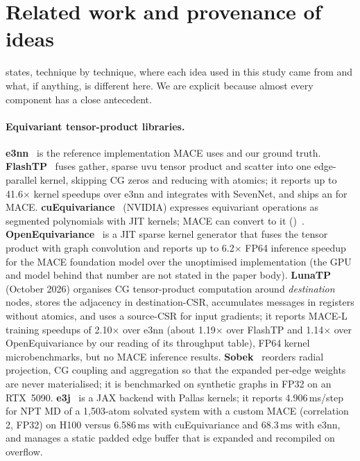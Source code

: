 \section{Related work and provenance of ideas}
\label{sec:related}

 states, technique by technique, where each idea used in this study came from and what, if anything, is different here. We are explicit because almost every component has a close antecedent.

\paragraph{Equivariant tensor-product libraries.}
\textbf{e3nn}~\cite{geiger2022e3nn} is the reference implementation MACE uses and our ground truth. \textbf{FlashTP}~\cite{lee2025flashtp} fuses gather, sparse uvu tensor product and scatter into one edge-parallel kernel, skipping CG zeros and reducing with atomics; it reports up to 41.6$\times$ kernel speedups over e3nn and integrates with SevenNet, and ships an  for MACE. \textbf{cuEquivariance}~\cite{cuequivariance} (NVIDIA) expresses equivariant operations as segmented polynomials with JIT kernels; MACE can convert to it ()~\cite{macedocs_cuda}. \textbf{OpenEquivariance}~\cite{bharadwaj2025oeq} is a JIT sparse kernel generator that fuses the tensor product with graph convolution and reports up to 6.2$\times$ FP64 inference speedup for the MACE foundation model over the unoptimised implementation (the GPU and model behind that number are not stated in the paper body). \textbf{LunaTP}~\cite{lunatp} (October 2026) organises CG tensor-product computation around \emph{destination} nodes, stores the adjacency in destination-CSR, accumulates messages in registers without atomics, and uses a source-CSR for input gradients; it reports MACE-L training speedups of 2.10$\times$ over e3nn (about 1.19$\times$ over FlashTP and 1.14$\times$ over OpenEquivariance by our reading of its throughput table), FP64 kernel microbenchmarks, but no MACE inference results. \textbf{Sobek}~\cite{sobek} reorders radial projection, CG coupling and aggregation so that the expanded per-edge weights are never materialised; it is benchmarked on synthetic graphs in FP32 on an RTX~5090. \textbf{e3j}~\cite{e3j} is a JAX backend with Pallas kernels; it reports 4.906\,ms/step for NPT MD of a 1{,}503-atom solvated system with a custom MACE (correlation 2, FP32) on H100 versus 6.586\,ms with cuEquivariance and 68.3\,ms with e3nn, and manages a static padded edge buffer that is expanded and recompiled on overflow.


